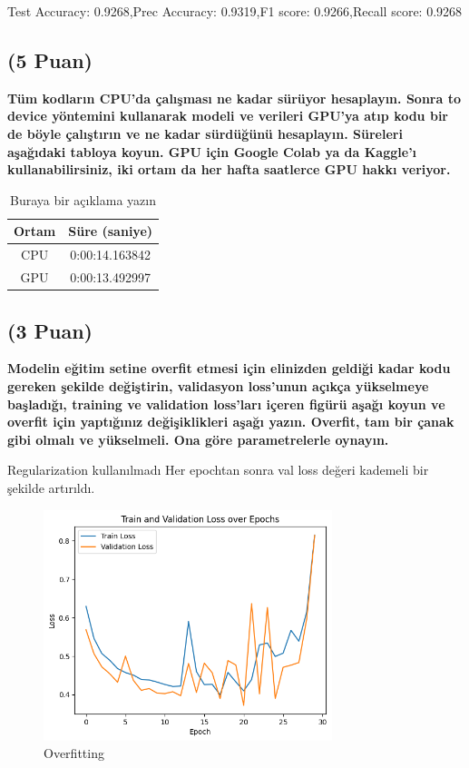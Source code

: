 \documentclass[11pt]{article}
\begin{document}
Test Accuracy: 0.9268,Prec Accuracy: 0.9319,F1 score: 0.9266,Recall score: 0.9268
\subsection{(5 Puan)} \textbf{Tüm kodların CPU'da çalışması ne kadar sürüyor hesaplayın. Sonra to device yöntemini kullanarak modeli ve verileri GPU'ya atıp kodu bir de böyle çalıştırın ve ne kadar sürdüğünü hesaplayın. Süreleri aşağıdaki tabloya koyun. GPU için Google Colab ya da Kaggle'ı kullanabilirsiniz, iki ortam da her hafta saatlerce GPU hakkı veriyor.}

\begin{table}[ht!]
    \centering
    \caption{Buraya bir açıklama yazın}
    \begin{tabular}{c|c}
        Ortam & Süre (saniye) \\\hline
        CPU &  0:00:14.163842   \\
        GPU &  0:00:13.492997 \\
    \end{tabular}
    \label{tab:my_table}
\end{table}

\subsection{(3 Puan)} \textbf{Modelin eğitim setine overfit etmesi için elinizden geldiği kadar kodu gereken şekilde değiştirin, validasyon loss'unun açıkça yükselmeye başladığı, training ve validation loss'ları içeren figürü aşağı koyun ve overfit için yaptığınız değişiklikleri aşağı yazın. Overfit, tam bir çanak gibi olmalı ve yükselmeli. Ona göre parametrelerle oynayın.}


Regularization kullanılmadı
Her epochtan sonra val loss değeri kademeli bir şekilde artırıldı.


\begin{figure}[ht!]
    \centering
    \includegraphics[width=0.75\textwidth]{overfit.png}
    \caption{Overfitting}
    \label{fig:overfitting}
\end{figure}
\end{document}
